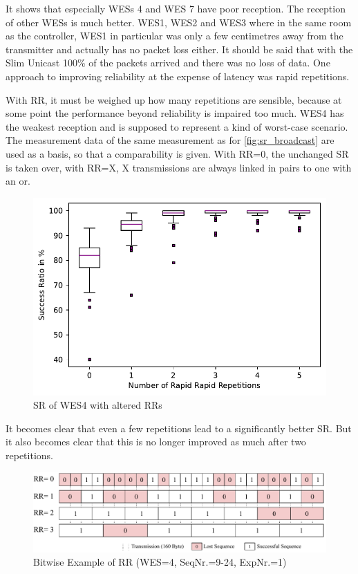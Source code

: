 It shows that especially WESs 4 and WES 7 have poor reception.
The reception of other WESs is much better.
WES1, WES2 and WES3 where in the same room as the controller, 
WES1 in particular was only a few centimetres away from the transmitter and actually has no packet loss either.
It should be said that with the Slim Unicast 100\% of the packets arrived and there was no loss of data.
One approach to improving reliability at the expense of latency was rapid repetitions.

With RR, it must be weighed up how many repetitions are sensible, 
because at some point the performance beyond reliability is impaired too much.
WES4 has the weakest reception and is supposed to represent a kind of worst-case scenario.
The measurement data of the same measurement as for \cref{fig:sr_broadcast} are used as a basis,
so that a comparability is given.
With RR=0, the unchanged SR is taken over, with RR=X, X transmissions are always linked in pairs to one with an or.

\begin{figure}[h]
	\centering
	\includegraphics[scale=0.6]{../Plot2/Graphs/SR_of_node4_rr.pdf}
	\caption{SR of WES4 with altered RRs}
	\label{fig:sr_broadcast_wes4}
\end{figure}

It becomes clear that even a few repetitions lead to a significantly better SR.
But it also becomes clear that this is no longer improved as much after two repetitions.

\begin{figure}[h]
	\centering
	\includegraphics[scale=0.5]{figures/rrBitwise.pdf}
	\caption{Bitwise Example of RR (WES=4, SeqNr.=9-24, ExpNr.=1)}
	\label{fig:rrBitwise}
\end{figure}

